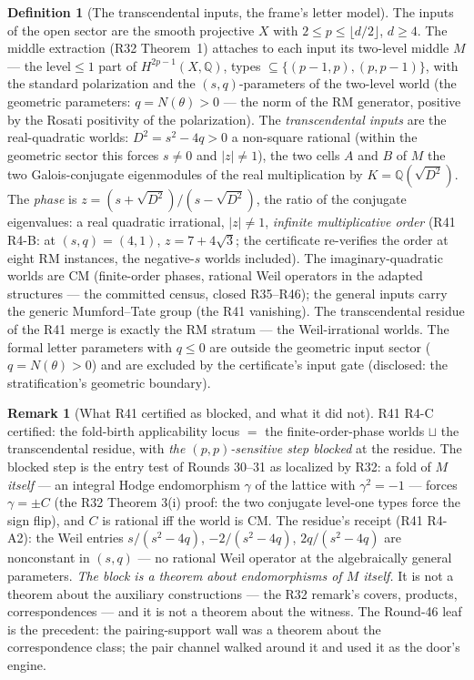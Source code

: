 \documentclass[11pt]{article}
\theoremstyle{definition}
\newtheorem{definition}[theorem]{Definition}
\newtheorem{remark}[theorem]{Remark}
\begin{document}
\begin{definition}[The transcendental inputs, the frame's letter model]\label{def:rminput}
The inputs of the open sector are the smooth projective $X$ with
$2\le p\le\lfloor d/2\rfloor$, $d\ge4$. The middle extraction (R32
Theorem~1) attaches to each input its two-level middle $M$ --- the
level${}\le{}1$ part of $H^{2p-1}(X,\mathbb{Q})$, types
$\subseteq\{(p-1,p),(p,p-1)\}$, with the standard polarization and the
$(s,q)$-parameters of the two-level world (the geometric parameters:
$q=N(\theta)>0$ --- the norm of the RM generator, positive by the
Rosati positivity of the polarization). The \emph{transcendental inputs} are the
real-quadratic worlds: $D^2=s^2-4q>0$ a non-square rational (within the
geometric sector this forces $s\neq0$ and $|z|\neq1$), the two cells $A$
and $B$ of $M$ the two Galois-conjugate eigenmodules of the real
multiplication by $K=\mathbb{Q}(\sqrt{D^2})$. The \emph{phase} is
$z=(s+\sqrt{D^2})/(s-\sqrt{D^2})$, the ratio of the conjugate
eigenvalues: a real quadratic irrational, $|z|\neq1$, \emph{infinite
multiplicative order} (R41 R4-B: at $(s,q)=(4,1)$, $z=7+4\sqrt3$; the
certificate re-verifies the order at eight RM instances, the negative-$s$
worlds included). The imaginary-quadratic worlds are CM (finite-order
phases, rational Weil operators in the adapted structures --- the
committed census, closed R35--R46); the general inputs carry the generic
Mumford--Tate group (the R41 vanishing). The transcendental residue of
the R41 merge is exactly the RM stratum --- the Weil-irrational worlds.
The formal letter parameters with $q\le0$ are outside the geometric
input sector ($q=N(\theta)>0$) and are excluded by the certificate's
input gate (disclosed: the stratification's geometric boundary).
\end{definition}

\begin{remark}[What R41 certified as blocked, and what it did not]
R41 R4-C certified: the fold-birth applicability locus $=$ the
finite-order-phase worlds $\sqcup$ the transcendental residue, with
\emph{the $(p,p)$-sensitive step blocked} at the residue. The blocked
step is the entry test of Rounds 30--31 as localized by R32: a fold of
$M$ \emph{itself} --- an integral Hodge endomorphism $\gamma$ of the
lattice with $\gamma^2=-1$ --- forces $\gamma=\pm C$ (the R32 Theorem
3(i) proof: the two conjugate level-one types force the sign flip), and
$C$ is rational iff the world is CM. The residue's receipt (R41 R4-A2):
the Weil entries $s/(s^2-4q)$, $-2/(s^2-4q)$, $2q/(s^2-4q)$ are
nonconstant in $(s,q)$ --- no rational Weil operator at the algebraically
general parameters. \emph{The block is a theorem about endomorphisms of
$M$ itself.} It is not a theorem about the auxiliary constructions ---
the R32 remark's covers, products, correspondences --- and it is not a
theorem about the witness. The Round-46 leaf is the precedent: the
pairing-support wall was a theorem about the correspondence class; the
pair channel walked around it and used it as the door's engine.
\end{remark}
\end{document}
